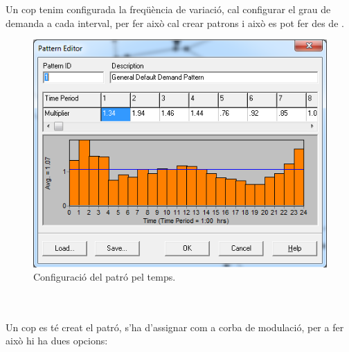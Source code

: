 \documentclass[12pt]{article}
\begin{document}
\\\\Un cop tenim configurada la freqüència de variació, cal configurar el grau de demanda a cada interval, per fer això cal crear patrons i això es pot fer des de . 
\pagebreak
\begin{figure}
	\centering
	\includegraphics[scale=.5]{imatges/epanet/16.png}
	\caption{Configuració del patró pel temps.}
\end{figure}
\\\\Un cop es té creat el patró, s'ha d'assignar com a corba de modulació, per a fer això hi ha dues opcions:
\end{document}
